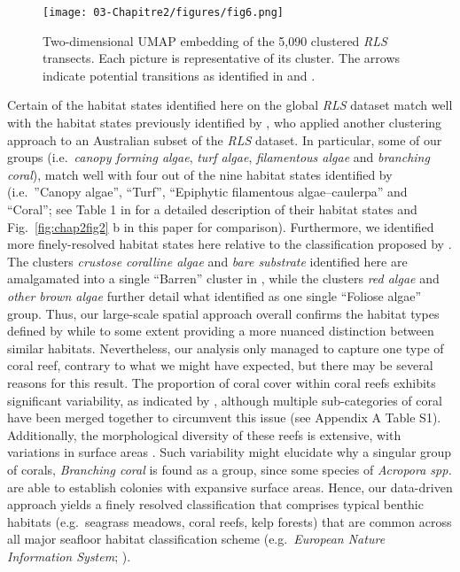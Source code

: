 \begin{refsection}
\begin{figure}
\hypertarget{fig:chap2fig6}{%
\centering
\texttt{[image: 03-Chapitre2/figures/fig6.png]}
\caption[Two-dimensional UMAP embedding of the 5,090 clustered
\emph{RLS} transects.]{Two-dimensional UMAP embedding of the 5,090 clustered
\emph{RLS} transects. Each picture is representative of its cluster. The
arrows indicate potential transitions as identified in
\textcite{Jouffray_2015} and
\textcite{Cornwall_2023}.}\label{fig:chap2fig6}
}
\end{figure}

Certain of the habitat states identified here on the global \emph{RLS}
dataset match well with the habitat states previously identified by
\textcite{Cresswell_2017}, who applied another clustering approach to an
Australian subset of the \emph{RLS} dataset. In particular, some of our
groups (i.e.~\emph{canopy forming algae}, \emph{turf algae},
\emph{filamentous algae} and \emph{branching coral}), match well with
four out of the nine habitat states identified by
\textcite{Cresswell_2017} (i.e.~''Canopy algae'', ``Turf'', ``Epiphytic
filamentous algae--caulerpa'' and ``Coral''; see Table 1 in
\textcite{Cresswell_2017} for a detailed description of their habitat
states and Fig.~\ref{fig:chap2fig2} b in this paper for comparison).
Furthermore, we identified more finely-resolved habitat states here
relative to the classification proposed by \textcite{Cresswell_2017}.
The clusters \emph{crustose coralline algae} and \emph{bare substrate}
identified here are amalgamated into a single ``Barren'' cluster in
\textcite{Cresswell_2017}, while the clusters \emph{red algae} and
\emph{other brown algae} further detail what \textcite{Cresswell_2017}
identified as one single ``Foliose algae'' group. Thus, our large-scale
spatial approach overall confirms the habitat types defined by
\textcite{Cresswell_2017} while to some extent providing a more nuanced
distinction between similar habitats. Nevertheless, our analysis only
managed to capture one type of coral reef, contrary to what we might
have expected, but there may be several reasons for this result. The
proportion of coral cover within coral reefs exhibits significant
variability, as indicated by \autocite{Death_2012}, although multiple
sub-categories of coral have been merged together to circumvent this
issue (see Appendix A Table S1). Additionally, the morphological
diversity of these reefs is extensive, with variations in surface areas
\autocite{Zawada_2019}. Such variability might elucidate why a singular
group of corals, \emph{Branching coral} is found as a group, since some
species of \emph{Acropora spp.} are able to establish colonies with
expansive surface areas. Hence, our data-driven approach yields a finely
resolved classification that comprises typical benthic habitats
(e.g.~seagrass meadows, coral reefs, kelp forests) that are common
across all major seafloor habitat classification scheme
(e.g.~\emph{European Nature Information System};
\textcite{Bajjouk_2015}).


\end{refsection}
